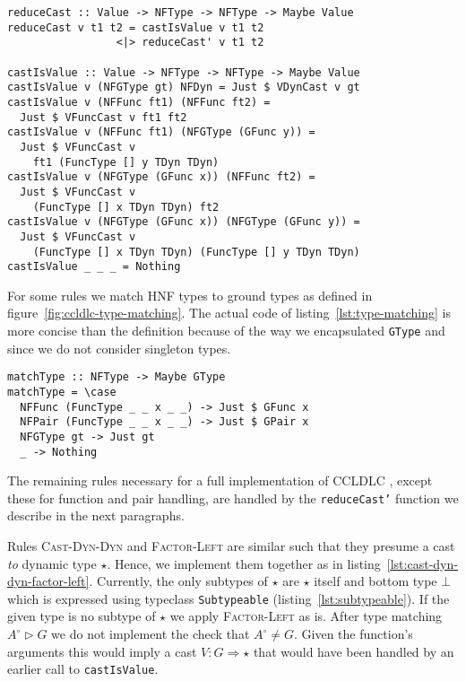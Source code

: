 \begin{lstlisting}[float,
  caption=Haskell: Rule \textsc{Cast-Is-Value} (\texttt{Interpreter.hs}),
  label=lst:cast-is-value]
reduceCast :: Value -> NFType -> NFType -> Maybe Value
reduceCast v t1 t2 = castIsValue v t1 t2
                 <|> reduceCast' v t1 t2

castIsValue :: Value -> NFType -> NFType -> Maybe Value
castIsValue v (NFGType gt) NFDyn = Just $ VDynCast v gt
castIsValue v (NFFunc ft1) (NFFunc ft2) =
  Just $ VFuncCast v ft1 ft2
castIsValue v (NFFunc ft1) (NFGType (GFunc y)) =
  Just $ VFuncCast v
    ft1 (FuncType [] y TDyn TDyn)
castIsValue v (NFGType (GFunc x)) (NFFunc ft2) =
  Just $ VFuncCast v
    (FuncType [] x TDyn TDyn) ft2
castIsValue v (NFGType (GFunc x)) (NFGType (GFunc y)) =
  Just $ VFuncCast v
    (FuncType [] x TDyn TDyn) (FuncType [] y TDyn TDyn)
castIsValue _ _ _ = Nothing
\end{lstlisting}

For some rules we match HNF types to ground types as defined in figure~\ref{fig:ccldlc-type-matching}. The actual code of listing~\ref{lst:type-matching} is more concise than the definition because of the way we encapsulated \texttt{GType} and since we do not consider singleton types.

\begin{lstlisting}[float,
  caption=Haskell: Type matching $A^\circ \rhd G$ (\texttt{Interpreter.hs}),
  label=lst:type-matching]
matchType :: NFType -> Maybe GType
matchType = \case
  NFFunc (FuncType _ _ x _ _) -> Just $ GFunc x
  NFPair (FuncType _ _ x _ _) -> Just $ GPair x
  NFGType gt -> Just gt
  _ -> Nothing
\end{lstlisting}

The remaining rules necessary for a full implementation of CCLDLC , except these for function and pair handling, are handled by the \texttt{reduceCast'} function we describe in the next paragraphs.

Rules \textsc{Cast-Dyn-Dyn} and \textsc{Factor-Left} are similar such that they presume a cast \emph{to} dynamic type $\star$. Hence, we implement them together as in listing~\ref{lst:cast-dyn-dyn-factor-left}. Currently, the only subtypes of $\star$ are $\star$ itself and bottom type $\bot$ which is expressed using typeclass \texttt{Subtypeable} (listing~\ref{lst:subtypeable}). If the given type is no subtype of $\star$ we apply \textsc{Factor-Left} as is. After type matching $A^\circ \rhd G$ we do not implement the check that $A^\circ \neq G$. Given the function's arguments this would imply a cast $V : G \Rightarrow \star$ that would have been handled by an earlier call to \texttt{castIsValue}.

